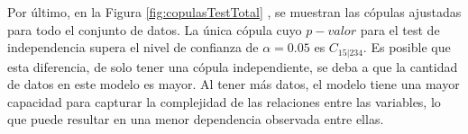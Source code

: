 Por último, en la Figura \ref{fig:copulasTestTotal}
, se muestran las cópulas ajustadas para todo el conjunto de datos. La única cópula cuyo $p-valor$ para el test de independencia supera el nivel de confianza de $\alpha = 0.05$ es $C_{15|234}$. Es posible que esta diferencia, de solo tener una cópula independiente, se deba a que la cantidad de datos en este modelo es mayor. Al tener más datos, el modelo tiene una mayor capacidad para capturar la complejidad de las relaciones entre las variables, lo que puede resultar en una menor dependencia observada entre ellas.